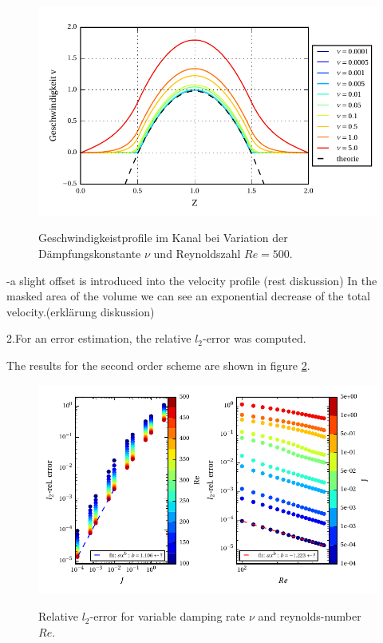 \begin{figure}[!b]
  \centering
  \includegraphics{gfx/immersed_boundary/poiseuille_flow/2_vp/vp_profile.pdf}\label{fig:vp_flow}
  \caption{Geschwindigkeistprofile im Kanal bei Variation der Dämpfungskonstante $\nu$ und Reynoldszahl $Re=500$.}
\end{figure}

-a slight offset is introduced into the velocity profile (rest diskussion)
In the masked area of the volume we can see an exponential decrease of the total velocity.(erklärung diskussion)

2.For an error estimation, the relative $l_2$-error was computed.

The results for the second order scheme are shown in figure \ref{fig:vp_error}.

\begin{figure}[!t]
  \centering
  \includegraphics{gfx/immersed_boundary/poiseuille_flow/2_vp/vp_error.pdf}\label{fig:vp_error}
  \caption{Relative $l_2$-error for variable damping rate $\nu$ and reynolds-number $Re$.}
\end{figure}


